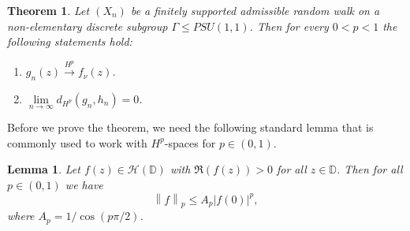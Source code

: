 \documentclass[11pt]{article}
\newtheorem{theorem}{Theorem}[section]
\newtheorem{lemma}{Lemma}[section]
\begin{document}
\begin{theorem}
	\label{convergence in H^p}
	Let $(X_n)$ be a finitely supported admissible random walk on a non-elementary discrete subgroup $\Gamma \leq PSU(1,1)$. Then for every $0 < p < 1$ the following statements hold:
	\begin{enumerate}
		\item $g_n(z) \xrightarrow{H^p} f_\nu(z)$.		
		\item $\lim\limits_{n \rightarrow \infty} d_{H^p}(g_n, h_n) = 0$.
	\end{enumerate}
\end{theorem}

Before we prove the theorem, we need the following standard lemma that is commonly used to work with $H^p$-spaces for $p \in (0, 1)$.

\begin{lemma}
	\label{Hp estimate positive real}
	Let $f(z) \in \mathcal{H}(\mathbb{D})$ with $\Re(f(z)) > 0$ for all $z \in \mathbb{D}$. Then for all $p \in (0, 1)$ we have
	\[
	\left\| f \right\|_p \le A_p |f(0)|^p,
	\]
	where $A_p = 1 / \cos(p \pi / 2)$. 
\end{lemma}
\end{document}
